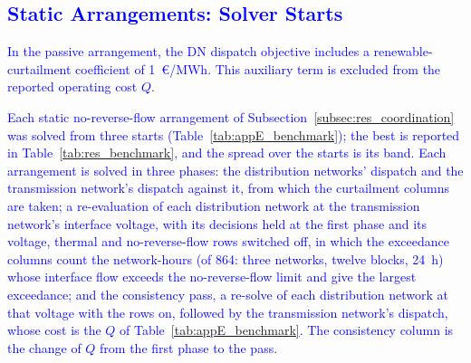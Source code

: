 \documentclass[preprint,12pt]{elsarticle}
\begin{document}
\subsection{\textcolor{blue}{Static Arrangements: Solver Starts}}
\label{app:results_benchmark}

\textcolor{blue}{
    In the passive arrangement, the DN dispatch objective includes a renewable-curtailment coefficient of 1~\euro/MWh. This auxiliary term is excluded from the reported operating cost $Q$.
}

\textcolor{blue}{
    Each static no-reverse-flow arrangement of Subsection~\ref{subsec:res_coordination} was solved from three starts (Table~\ref{tab:appE_benchmark}); the best is reported in Table~\ref{tab:res_benchmark}, and the spread over the starts is its band. Each arrangement is solved in three phases: 
    the distribution networks' dispatch and the transmission network's dispatch against it, from which the curtailment columns are taken; 
    a re-evaluation of each distribution network at the transmission network's interface voltage, with its decisions held at the first phase and its voltage, thermal and no-reverse-flow rows switched off, in which the exceedance columns count the network-hours (of 864: three networks, twelve blocks, 24~h) whose interface flow exceeds the no-reverse-flow limit and give the largest exceedance; and 
    the consistency pass, a re-solve of each distribution network at that voltage with the rows on, followed by the transmission network's dispatch, whose cost is the $Q$ of Table~\ref{tab:appE_benchmark}. The consistency column is the change of $Q$ from the first phase to the pass.
}
\end{document}
